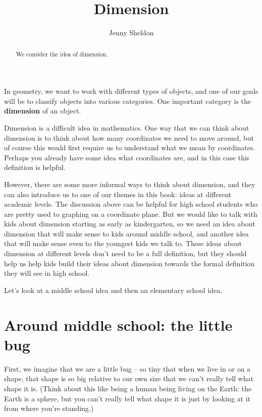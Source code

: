 \documentclass{ximera}
\title{Dimension}
\author{Jenny Sheldon}
\begin{document}
\begin{abstract}
We consider the idea of dimension.
\end{abstract}
\maketitle

In geometry, we want to work with different types of objects, and one of our goals will be to classify objects into various categories. One important category is the {\bf dimension} of an object.

Dimension is a difficult idea in mathematics. One way that we can think about dimension is to think about how many coordinates we need to move around, but of course this would first require us to understand what we mean by coordinates. Perhaps you already have some idea what coordinates are, and in this case this definition is helpful.

However, there are some more informal ways to think about dimension, and they can also introduce us to one of our themes in this book: ideas at different academic levels. The discussion above can be helpful for high school students who are pretty used to graphing on a coordinate plane. But we would like to talk with kids about dimension starting as early as kindergarten, so we need an idea about dimension that will make sense to kids around middle school, and another idea that will make sense even to the youngest kids we talk to. These ideas about dimension at different levels don't need to be a full definition, but they should help us help kids build their ideas about dimension towards the formal definition they will see in high school. 

Let's look at a middle school idea and then an elementary school idea.

\section{Around middle school: the little bug}

First, we imagine that we are a little bug -- so tiny that when we live in or on a shape, that shape is so big relative to our own size that we can't really tell what shape it is. (Think about this like being a human being living on the Earth: the Earth is a sphere, but you can't really tell what shape it is just by looking at it from where you're standing.)
\end{document}
